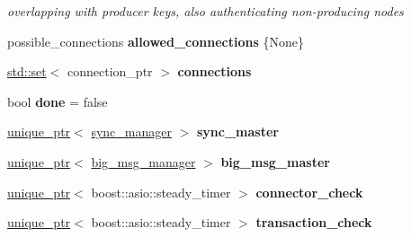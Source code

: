 \begin{DoxyCompactItemize}
\begin{DoxyCompactList}\small\item\em overlapping with producer keys, also authenticating non-\/producing nodes \end{DoxyCompactList}\item 
\mbox{\label{classaacio_1_1net__plugin__impl_a8d149d2c94eb1c6b2ff496c4c3d5ae8d}} 
possible\+\_\+connections {\bfseries allowed\+\_\+connections} \{None\}
\item 
\mbox{\label{classaacio_1_1net__plugin__impl_aa8eebcf661ec7b8e64ea1f52b93da71d}} 
\mbox{\hyperlink{classstd_1_1set}{std\+::set}}$<$ connection\+\_\+ptr $>$ {\bfseries connections}
\item 
\mbox{\label{classaacio_1_1net__plugin__impl_a2e45cee8304a7cbabc1b99b9c3f2339c}} 
bool {\bfseries done} = false
\item 
\mbox{\label{classaacio_1_1net__plugin__impl_adf80ea7baa18b0f1977554b7a9f31087}} 
\mbox{\hyperlink{classfc_1_1unique__ptr}{unique\+\_\+ptr}}$<$ \mbox{\hyperlink{classaacio_1_1sync__manager}{sync\+\_\+manager}} $>$ {\bfseries sync\+\_\+master}
\item 
\mbox{\label{classaacio_1_1net__plugin__impl_a221777d2b7a10e5ed87dc1d47893f605}} 
\mbox{\hyperlink{classfc_1_1unique__ptr}{unique\+\_\+ptr}}$<$ \mbox{\hyperlink{classaacio_1_1big__msg__manager}{big\+\_\+msg\+\_\+manager}} $>$ {\bfseries big\+\_\+msg\+\_\+master}
\item 
\mbox{\label{classaacio_1_1net__plugin__impl_add40eadb9567e2993c5da87e7a016ce6}} 
\mbox{\hyperlink{classfc_1_1unique__ptr}{unique\+\_\+ptr}}$<$ boost\+::asio\+::steady\+\_\+timer $>$ {\bfseries connector\+\_\+check}
\item 
\mbox{\label{classaacio_1_1net__plugin__impl_a278cf4696eafc1ae4ccd20a0fbc32c18}} 
\mbox{\hyperlink{classfc_1_1unique__ptr}{unique\+\_\+ptr}}$<$ boost\+::asio\+::steady\+\_\+timer $>$ {\bfseries transaction\+\_\+check}
\item 
\mbox{\label{classaacio_1_1net__plugin__impl_ab9fdbef8ab04759c86894539cf9d462c}} 

\end{DoxyCompactItemize}
